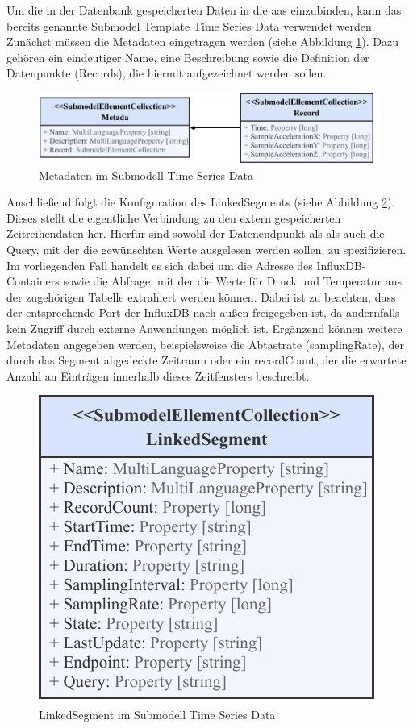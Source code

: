 Um die in der Datenbank gespeicherten Daten in die \acs{aas} einzubinden, kann das bereits genannte Submodel Template Time Series Data verwendet werden.
Zunächst müssen die Metadaten eingetragen werden (siehe Abbildung \ref{fig:MetadataTimeSeries}).
Dazu gehören ein eindeutiger Name, eine Beschreibung sowie die Definition der Datenpunkte (Records), die hiermit aufgezeichnet werden sollen.

\begin{figure}[htbp]
    \centering
    \includegraphics[width=1\textwidth]{Bilder/TimeSeries/Metadaten.pdf}
    \caption{Metadaten im Submodell Time Series Data}
    \label{fig:MetadataTimeSeries}
\end{figure}

Anschließend folgt die Konfiguration des LinkedSegments (siehe Abbildung \ref{fig:LinkedSegmentTimeSeries}). 
Dieses stellt die eigentliche Verbindung zu den extern gespeicherten Zeitreihendaten her.
Hierfür sind sowohl der Datenendpunkt als als auch die Query, mit der die gewünschten Werte ausgelesen werden sollen, zu spezifizieren.
Im vorliegenden Fall handelt es sich dabei um die Adresse des InfluxDB-Containers sowie die Abfrage, mit der die Werte für Druck und Temperatur aus der zugehörigen Tabelle extrahiert werden können.
Dabei ist zu beachten, dass der entsprechende Port der InfluxDB nach außen freigegeben ist, da andernfalls kein Zugriff durch externe Anwendungen möglich ist.
Ergänzend können weitere Metadaten angegeben werden, beispielsweise die Abtastrate (samplingRate), der durch das Segment abgedeckte Zeitraum oder ein recordCount, der die erwartete Anzahl an Einträgen innerhalb dieses Zeitfensters beschreibt.

\begin{figure}[htbp]
    \centering
    \includegraphics{Bilder/TimeSeries/LinkedSegment.pdf}
    \caption{LinkedSegment im Submodell Time Series Data}
    \label{fig:LinkedSegmentTimeSeries}
\end{figure}

